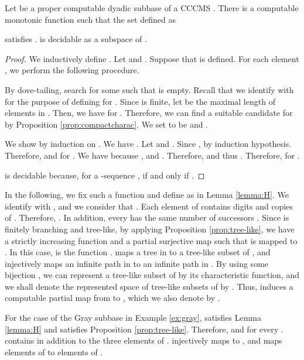 \documentclass{eptcs-modified}
\begin{document}
\begin{lemma}\label{lemma:H}
Let  be a proper computable dyadic subbase of a CCCMS .
There is a computable monotonic function  such that
the set  defined as

satisfies .
 is decidable as a subspace of .
\label{lem:H}

\begin{proof}
We inductively define .
Let  and .
Suppose that  is defined.
For each element , we perform the following procedure.

By dove-tailing, search for some  such that  is empty.
Recall that we identify  with  for the purpose of defining  for .
Since  is finite, let  be the maximal length
of elements in .  Then,
we have  for .
Therefore, we can find a suitable candidate for 
by Proposition \ref{prop:compactcharac}.
We set  to be  and
.

We show  by induction on .
We have .
Let  and .
Since ,  by induction hypothesis.
Therefore,  and  for .
We have  because ,
and .
Therefore,  and thus .
Therefore,  for .

 is decidable because,
for a -sequence ,  if and only if .

\end{proof}
\end{lemma}

In the following, we fix such a function
 and define  as in Lemma \ref{lemma:H}.
We identify  with , and
we consider that .
Each element of   contains  digits and  copies of .  Therefore, .
In addition,  every   has the same number of successors
.
Since  is finitely branching and tree-like,
by applying Proposition \ref{prop:tree-like}, we have a strictly increasing function 
and a partial surjective map  such that
 is mapped to .
In this case,  is the function .
 maps a tree in  to a tree-like subset of  ,
and injectively maps an infinite path in  to an infinite path in .
By using some bijection , we can represent a tree-like subset of  by its characteristic function, and we shall denote the represented space of tree-like subsets of  by .
Thus,  induces a computable partial map from  to , which we also denote by .



\begin{example}

  For the case of the Gray subbase  in Example \ref{ex:gray},  satisfies Lemma \ref{lemma:H}
and  satisfies Proposition \ref{prop:tree-like}.
Therefore,
 and  for every  .
 contains  in addition to the three elements of
.
 injectively maps  to , and
maps  elements of  to  elements of .
\end{example}
\end{document}
